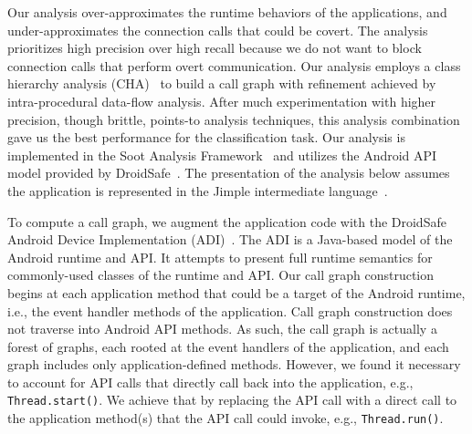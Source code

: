 Our analysis over-approximates the runtime
behaviors of the applications, and under-approximates the connection
calls that could be covert.
The analysis prioritizes high precision over high recall because we do
not want to block connection calls that perform overt
communication. Our analysis employs a class hierarchy analysis
(CHA)~\cite{Dean1995} to build a call graph with refinement achieved
by intra-procedural data-flow analysis.  After much experimentation
with higher precision, though brittle, points-to analysis techniques,
this analysis combination gave us the best performance for the
classification task.  Our analysis is implemented in the Soot Analysis
Framework~\cite{Vallee-Rai2000} and utilizes the Android API model
provided by
DroidSafe~\cite{Gordon:Kim:Perkins:Gilham:Nguyen:Rinard:NDSS15}. The
presentation of the analysis below assumes the application is
represented in the Jimple intermediate language~\cite{Vallee-Rai2000}.

To compute a call graph, we augment the application code with the
DroidSafe Android Device Implementation
(ADI)~\cite{Gordon:Kim:Perkins:Gilham:Nguyen:Rinard:NDSS15}.  The ADI
is a Java-based model of the Android runtime and API. It attempts to
present full runtime semantics for commonly-used classes of the
runtime and API.  Our call graph construction begins at each
application method that could be a target of the Android runtime, i.e., 
the event handler methods of the application.  Call graph
construction does not traverse into Android API methods. 
As such, the call
graph is actually a forest of graphs, each rooted at the event
handlers of the application, and each graph includes only
application-defined methods.  However, we found it necessary to
account for API calls that directly call back into the application,
e.g., \lstinline!Thread.start()!. We achieve that by replacing the API call with a
direct call to the application method(s) that the API call could
invoke, e.g., \lstinline!Thread.run()!.



